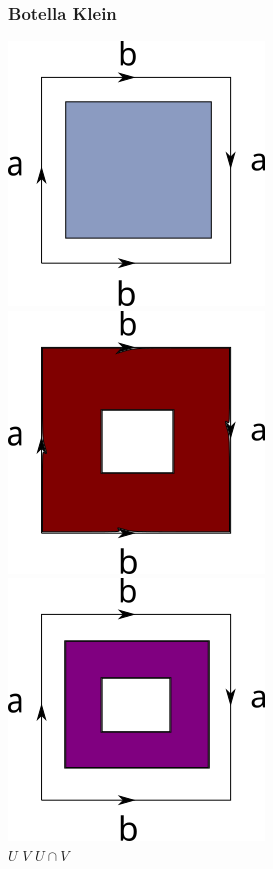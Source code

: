 \documentclass[xetex,mathserif,serif]{beamer}
\begin{document}
  \begin{frame}
    \frametitle{Botella Klein}
    \begin{center}
      \includegraphics[scale=0.3]{../tesis/imagenes/kleinU.png}
      \hspace{3mm}
      \includegraphics[scale=0.3]{../tesis/imagenes/kleinV.png}
      \hspace{3mm}
      \includegraphics[scale=0.3]{../tesis/imagenes/kleinUV.png} \\
      \hspace{2mm} \(U\) \hspace{19mm} \(V\) \hspace{16mm} \(U \cap V\)

\end{center}
\end{frame}
\end{document}
